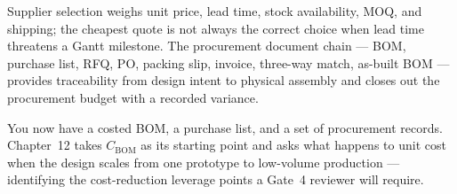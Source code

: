 Supplier selection weighs unit price, lead time, stock availability, MOQ, and
shipping; the cheapest quote is not always the correct choice when lead time
threatens a Gantt milestone.
The procurement document chain --- BOM, purchase list, RFQ, PO, packing slip,
invoice, three-way match, as-built BOM --- provides traceability from design
intent to physical assembly and closes out the procurement budget with a
recorded variance.

You now have a costed BOM, a purchase list, and a set of procurement records.
Chapter~12 takes $C_{\text{BOM}}$ as its starting point and asks what happens to unit cost when the design scales from one prototype to low-volume production --- identifying the cost-reduction leverage points a Gate~4 reviewer will require.
